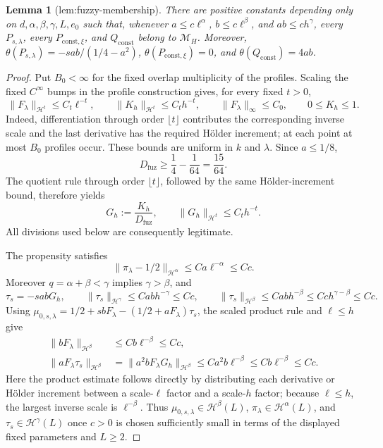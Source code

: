 \documentclass{article}
\newtheorem{lemma}{Lemma}
\begin{document}
\begin{lemma}[lem:fuzzy-membership]\label{lem:fuzzy-membership}
There are positive constants depending only on \(d,\alpha,\beta,\gamma,L,e_0\) such that, whenever \(a\le c\ell^\alpha\), \(b\le c\ell^\beta\), and \(ab\le ch^\gamma\), every \(P_{s,\lambda}\), every \(P_{\mathrm{const},\xi}\), and \(Q_{\mathrm{const}}\) belong to \(\mathcal M_H\). Moreover, \(\theta(P_{s,\lambda})=-sab/(1/4-a^2)\), \(\theta(P_{\mathrm{const},\xi})=0\), and \(\theta(Q_{\mathrm{const}})=4ab\).
\end{lemma}
\begin{proof}
Put \(B_0<\infty\) for the fixed overlap multiplicity of the profiles.  Scaling the fixed \(C^\infty\) bumps in the profile construction gives, for every fixed \(t>0\),
\[
 \|F_\lambda\|_{\mathcal H^t}\le C_t\ell^{-t},
 \qquad
 \|K_h\|_{\mathcal H^t}\le C_t h^{-t},
 \qquad
 \|F_\lambda\|_\infty\le C_0,
 \qquad 0\le K_h\le1 .
\]
Indeed, differentiation through order \(\lfloor t\rfloor\) contributes the corresponding inverse scale and the last derivative has the required Hölder increment; at each point at most \(B_0\) profiles occur.  These bounds are uniform in \(k\) and \(\lambda\).  Since \(a\le1/8\),
\[
 D_{\mathrm{fuz}}\ge \frac14-\frac1{64}=\frac{15}{64}.
\]
The quotient rule through order \(\lfloor t\rfloor\), followed by the same Hölder-increment bound, therefore yields
\[
 G_h:=\frac{K_h}{D_{\mathrm{fuz}}},
 \qquad
 \|G_h\|_{\mathcal H^t}\le C_t h^{-t}.
\]
All divisions used below are consequently legitimate.

The propensity satisfies
\[
 \|\pi_\lambda-1/2\|_{\mathcal H^\alpha}
 \le C a\ell^{-\alpha}\le Cc.
\]
Moreover \(q=\alpha+\beta<\gamma\) implies \(\gamma>\beta\), and
\[
 \tau_s=-sabG_h,
 \qquad
 \|\tau_s\|_{\mathcal H^\gamma}
 \le C ab h^{-\gamma}\le Cc,
 \qquad
 \|\tau_s\|_{\mathcal H^\beta}
 \le C ab h^{-\beta}\le Cc h^{\gamma-\beta}\le Cc.
\]
Using \(\mu_{0,s,\lambda}=1/2+sbF_\lambda-(1/2+aF_\lambda)\tau_s\), the scaled product rule and \(\ell\le h\) give
\[
 \begin{aligned}
 \|bF_\lambda\|_{\mathcal H^\beta}
   &\le Cb\ell^{-\beta}\le Cc,\\
 \|aF_\lambda\tau_s\|_{\mathcal H^\beta}
   &=\|a^2bF_\lambda G_h\|_{\mathcal H^\beta}
     \le Ca^2b\ell^{-\beta}
     \le Cb\ell^{-\beta}\le Cc.
 \end{aligned}
\]
Here the product estimate follows directly by distributing each derivative or Hölder increment between a scale-\(\ell\) factor and a scale-\(h\) factor; because \(\ell\le h\), the largest inverse scale is \(\ell^{-\beta}\).  Thus \(\mu_{0,s,\lambda}\in\mathcal H^\beta(L)\), \(\pi_\lambda\in\mathcal H^\alpha(L)\), and \(\tau_s\in\mathcal H^\gamma(L)\) once \(c>0\) is chosen sufficiently small in terms of the displayed fixed parameters and \(L\ge2\).


\end{proof}
\end{document}
